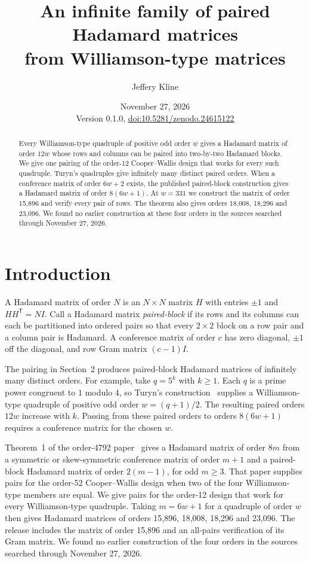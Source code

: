 \documentclass[10pt]{article}
\title{An infinite family of paired Hadamard matrices\\from Williamson-type matrices}
\author{Jeffery Kline}
\date{November 27, 2026\\[3pt]\small Version 0.1.0, \href{https://doi.org/10.5281/zenodo.24615122}{doi:10.5281/zenodo.24615122}}
\newcommand{\tr}{^{\mathsf T}}
\begin{document}
\maketitle

\begin{abstract}
Every Williamson-type quadruple of positive odd order $w$ gives a Hadamard matrix of order $12w$ whose rows and columns can be paired into two-by-two Hadamard blocks. We give one pairing of the order-12 Cooper--Wallis design that works for every such quadruple. Turyn's quadruples give infinitely many distinct paired orders. When a conference matrix of order $6w+2$ exists, the published paired-block construction gives a Hadamard matrix of order $8(6w+1)$. At $w=331$ we construct the matrix of order 15,896 and verify every pair of rows. The theorem also gives orders 18,008, 18,296 and 23,096. We found no earlier construction at these four orders in the sources searched through November 27, 2026.
\end{abstract}

\section{Introduction}

A Hadamard matrix of order $N$ is an $N\times N$ matrix $H$ with entries $\pm1$ and $HH\tr=NI$. Call a Hadamard matrix \emph{paired-block} if its rows and its columns can each be partitioned into ordered pairs so that every $2\times2$ block on a row pair and a column pair is Hadamard. A conference matrix of order $c$ has zero diagonal, $\pm1$ off the diagonal, and row Gram matrix $(c-1)I$.

The pairing in Section~2 produces paired-block Hadamard matrices of infinitely many distinct orders. For example, take $q=5^k$ with $k\ge1$. Each $q$ is a prime power congruent to $1$ modulo $4$, so Turyn's construction~\cite{Tu72} supplies a Williamson-type quadruple of positive odd order $w=(q+1)/2$. The resulting paired orders $12w$ increase with $k$. Passing from these paired orders to orders $8(6w+1)$ requires a conference matrix for the chosen $w$.

Theorem~1 of the order-4792 paper~\cite{Kl4792} gives a Hadamard matrix of order $8m$ from a symmetric or skew-symmetric conference matrix of order $m+1$ and a paired-block Hadamard matrix of order $2(m-1)$, for odd $m\ge3$. That paper supplies pairs for the order-52 Cooper--Wallis design when two of the four Williamson-type members are equal. We give pairs for the order-12 design that work for every Williamson-type quadruple. Taking $m=6w+1$ for a quadruple of order $w$ then gives Hadamard matrices of orders 15,896, 18,008, 18,296 and 23,096. The release includes the matrix of order 15,896 and an all-pairs verification of its Gram matrix. We found no earlier construction of the four orders in the sources searched through November 27, 2026.
\end{document}
